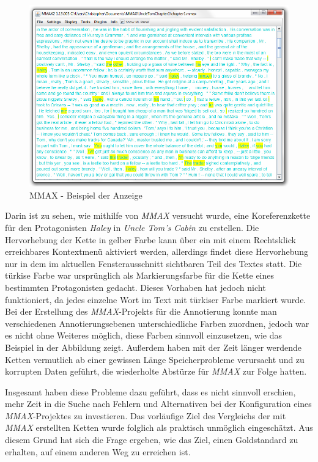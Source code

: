 \documentclass[a4paper,12pt,titlepage=true, ngerman]{scrartcl}
\begin{document}
\begin{figure}[ht]
\begin{center}
\includegraphics[width=15cm]{./img/cmich/cm_mmax.jpg}
\caption{MMAX - Beispiel der Anzeige}
\label{mmax:anzeige}
\end{center}
\end{figure}

Darin ist zu sehen, wie mithilfe von \emph{MMAX} versucht wurde, eine Koreferenzkette 
für den Protagonisten \emph{Haley} in \emph{Uncle Tom's Cabin} \autocite[]{chris_uncle} zu erstellen. 
Die Hervorhebung der Kette in gelber Farbe kann über ein mit einem Rechtsklick erreichbares Kontextmenü 
aktiviert werden, allerdings findet diese Hervorhebung nur in dem im aktuellen Fensterausschnitt 
sichtbaren Teil des Textes statt. 
Die türkise Farbe war ursprünglich als Markierungsfarbe für die Kette eines bestimmten Protagonisten gedacht. 
Dieses Vorhaben hat jedoch nicht funktioniert, da jedes einzelne Wort im Text mit türkiser Farbe markiert wurde. 
Bei der Erstellung des \emph{MMAX}-Projekts für die Annotierung konnte man 
verschiedenen Annotierungsebenen unterschiedliche Farben zuordnen, 
jedoch war es nicht ohne Weiteres möglich, diese Farben sinnvoll einzusetzen, 
wie das Beispiel in der Abbildung zeigt. 
Außerdem haben mit der Zeit länger werdende Ketten vermutlich ab einer gewissen Länge Speicherprobleme verursacht 
und zu korrupten Daten geführt, die wiederholte Abstürze für \emph{MMAX} zur Folge hatten. 

Insgesamt haben diese Probleme dazu geführt, dass es nicht sinnvoll erschien, 
mehr Zeit in die Suche nach Fehlern und Alternativen bei der Konfiguration 
eines \emph{MMAX}-Projektes zu investieren. 
Das vorläufige Ziel des Vergleichs der mit \emph{MMAX} erstellten Ketten wurde folglich 
als praktisch unmöglich eingeschätzt. 
Aus diesem Grund hat sich die Frage ergeben, wie das Ziel, einen Goldstandard zu erhalten, 
auf einem anderen Weg zu erreichen ist.
\end{document}
